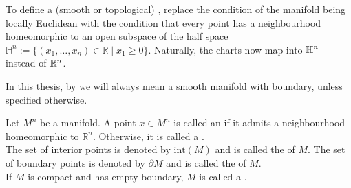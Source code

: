 \documentclass[a4paper,11pt]{article}
\begin{document}
\begin{definition}
    To define a (smooth or topological) , replace the condition of the manifold being locally Euclidean with the condition that every point has a neighbourhood homeomorphic to an open subspace of the half space \(\mathbb{H}^n:=\{(x_1,\dots,x_n)\in\mathbb{R}\mid x_1\geq0\}\). Naturally, the charts now map into \(\mathbb{H}^n\) instead of \(\mathbb{R}^n\).
\end{definition}

\begin{comment}
\begin{definition}[Manifold]
    A \demph{smooth manifold with boundary} \(M=(M,[\mathcal{A}])\) is the data of a topological space \(M\) and an equivalence class \([\mathcal{A}]\) of smooth atlases such that:
    \begin{itemize}
        \item \(M\) is Hausdorff,
        \item \(M\) is second countable,
        \item \(\mathcal{A}\) is locally finite.
    \end{itemize}
\end{definition}
\end{comment}

\begin{remark}
    In this thesis, by  we will always mean a smooth manifold with boundary, unless specified otherwise.
\end{remark}

\begin{definition}
    Let \(M^n\) be a manifold. A point \(x\in M^n\) is called an  if it admits a neighbourhood homeomorphic to \(\mathbb{R}^n\). Otherwise, it is called a .\\
    The set of interior points is denoted by \(\mathrm{int}(M)\) and is called the  of \(M\). The set of boundary points is denoted by \(\partial M\) and is called the  of \(M\).\\
    If \(M\) is compact and has empty boundary, \(M\) is called a . %
\end{definition}
\end{document}
